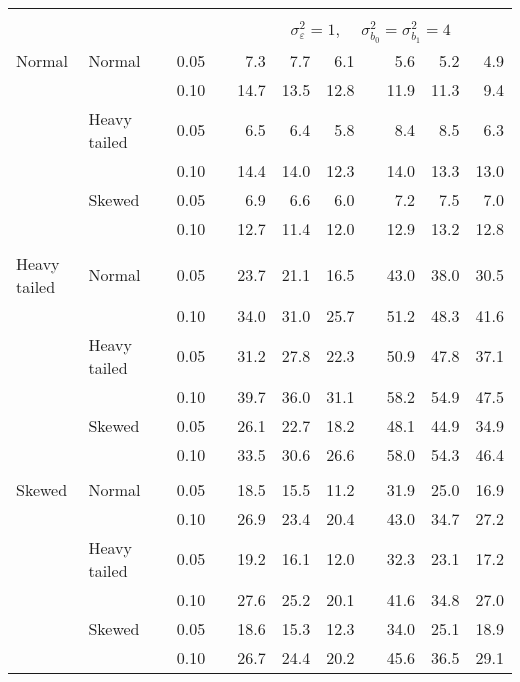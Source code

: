 \begin{table}[ht]
\begin{scriptsize}
\begin{tabular}{ll p{.1cm} c p{.1cm} rrr p{.1cm} rrr}
&&&&&&&&&&&\\
& && && \multicolumn{7}{c}{$\sigma_{\varepsilon}^2 = 1$, \ \ $\sigma_{b_0}^2 = \sigma_{b_1}^2 = 4$} \\ \cline{6-12}
\rowcolor{gray!20} Normal & Normal &  & 0.05 &  & 7.3 & 7.7 & 6.1 &  & 5.6 & 5.2 & 4.9 \\ 
\rowcolor{gray!20}    &  &  & 0.10 &  & 14.7 & 13.5 & 12.8 &  & 11.9 & 11.3 & 9.4 \\ 
\rowcolor{gray!20}    & Heavy tailed &  & 0.05 &  & 6.5 & 6.4 & 5.8 &  & 8.4 & 8.5 & 6.3 \\ 
\rowcolor{gray!20}    &  &  & 0.10 &  & 14.4 & 14.0 & 12.3 &  & 14.0 & 13.3 & 13.0 \\ 
\rowcolor{gray!20}    & Skewed &  & 0.05 &  & 6.9 & 6.6 & 6.0 &  & 7.2 & 7.5 & 7.0 \\ 
\rowcolor{gray!20}    &  &  & 0.10 &  & 12.7 & 11.4 & 12.0 &  & 12.9 & 13.2 & 12.8 \\ 
&&&&&&&&&&&\\
  Heavy tailed & Normal &  & 0.05 &  & 23.7 & 21.1 & 16.5 &  & 43.0 & 38.0 & 30.5 \\ 
   &  &  & 0.10 &  & 34.0 & 31.0 & 25.7 &  & 51.2 & 48.3 & 41.6 \\ 
   & Heavy tailed &  & 0.05 &  & 31.2 & 27.8 & 22.3 &  & 50.9 & 47.8 & 37.1 \\ 
   &  &  & 0.10 &  & 39.7 & 36.0 & 31.1 &  & 58.2 & 54.9 & 47.5 \\ 
   & Skewed &  & 0.05 &  & 26.1 & 22.7 & 18.2 &  & 48.1 & 44.9 & 34.9 \\ 
   &  &  & 0.10 &  & 33.5 & 30.6 & 26.6 &  & 58.0 & 54.3 & 46.4 \\ 
&&&&&&&&&&&\\
  Skewed & Normal &  & 0.05 &  & 18.5 & 15.5 & 11.2 &  & 31.9 & 25.0 & 16.9 \\ 
   &  &  & 0.10 &  & 26.9 & 23.4 & 20.4 &  & 43.0 & 34.7 & 27.2 \\ 
   & Heavy tailed &  & 0.05 &  & 19.2 & 16.1 & 12.0 &  & 32.3 & 23.1 & 17.2 \\ 
   &  &  & 0.10 &  & 27.6 & 25.2 & 20.1 &  & 41.6 & 34.8 & 27.0 \\ 
   & Skewed &  & 0.05 &  & 18.6 & 15.3 & 12.3 &  & 34.0 & 25.1 & 18.9 \\ 
   &  &  & 0.10 &  & 26.7 & 24.4 & 20.2 &  & 45.6 & 36.5 & 29.1 \\ 

\hline
\end{tabular}
\end{scriptsize}
\end{table}


